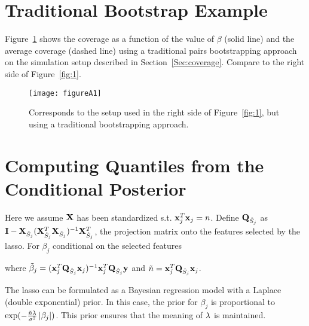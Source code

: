 \section{Traditional Bootstrap Example}
\label{sec:boot-fail}

Figure~\ref{fig:A1} shows the coverage as a function of the value of $\beta$ (solid line) and the average coverage (dashed line) using a traditional pairs bootstrapping approach on the simulation setup described in Section~\ref{Sec:coverage}. Compare to the right side of Figure~\ref{fig:1}.

\begin{figure}[hbtp]
  \begin{center}
  \texttt{[image: figureA1]}
  \caption{\label{fig:A1} Corresponds to the setup used in the right side of Figure~\ref{fig:1}, but using a traditional bootstrapping approach.}
  \end{center}
\end{figure}

\clearpage

\section{Computing Quantiles from the Conditional Posterior}\label{Sup:A}

Here we assume $\mathbf{X}$ has been standardized s.t. $\mathbf{x}_j^T\mathbf{x}_j = n$. Define $\mathbf{Q}_{\hat{S}_j}$ as $\mathbf{I} - \mathbf{X}_{\hat{S}_j}(\mathbf{X}_{\hat{S}_j}^T \mathbf{X}_{\hat{S}_j})^{-1} \mathbf{X}_{\hat{S}_j}^T$, the projection matrix onto the features selected by the lasso. For $\beta_j$ conditional on the selected features

\noindent where $\tilde{\beta}_j = (\mathbf{x}_j^T \mathbf{Q}_{\hat{S}_j} \mathbf{x}_j)^{-1} \mathbf{x}_j^T \mathbf{Q}_{\hat{S}_j} \mathbf{y}$ and $\tilde{n} = \mathbf{x}_j^T \mathbf{Q}_{\hat{S}_j} \mathbf{x}_j$.

The lasso can be formulated as a Bayesian regression model with a Laplace (double exponential) prior. In this case, the prior for $\beta_j$ is proportional to $\exp(-\frac{\tilde{n} \lambda} {\sigma^2} \left\lvert\beta_j\right\rvert)$. This prior ensures that the meaning of $\lambda$ is maintained.


